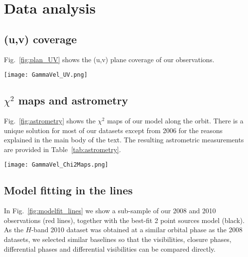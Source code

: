 \documentclass[usenatbib]{mnras}%
\begin{document}
 
\appendix\section{Data analysis}
\subsection{(u,v) coverage}
\label{sec:uvcov}
Fig.~\ref{fig:plan_UV} shows the (u,v) plane coverage of our observations.

\begin{figure*}
  \centering
    \texttt{[image: GammaVel\_UV.png]}
  \caption{(u,v) plane of the observations for each epoch. Note that the North is up and the East is left, as if the (u,v) coordinates were seen on the plane of the sky. The circles represent the Unit Telescopes, the dots represent the Auxiliary Telescopes.}
    \label{fig:plan_UV}
\end{figure*}


\subsection{$\chi^2$ maps and astrometry}
\label{sec:chi2maps}
Fig.~\ref{fig:astrometry} shows  the $\chi^2$ maps of our model along the orbit. There is a unique solution for most of our datasets except from 2006 for the reasons explained in the main body of the text. The resulting astrometric measurements are provided in Table~\ref{tab:astrometry}.

\begin{figure*}
  \centering
    \texttt{[image: GammaVel\_Chi2Maps.png]}
  \caption{$\chi^2$ maps for our binary star model positions for each epoch of observation, showing the orbital motion of the system. The green asterisks show the best-match position to our data, while the red contours are the 1, 2 and 3$\sigma$ error contours.}
    \label{fig:astrometry}
\end{figure*}

\subsection{Model fitting in the lines}
\label{sec:model_lines}

In Fig.~\ref{fig:modelfit_lines} we show a sub-sample of our 2008 and 2010 observations (red lines), together with the best-fit 2 point sources model (black). As the $H$-band 2010 dataset was obtained at a similar orbital phase as the 2008 datasets, we selected similar baselines so that the visibilities, closure phases, differential phases and differential visibilities can be compared directly.
\end{document}
